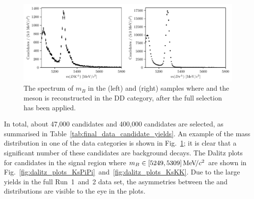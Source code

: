 

\begin{figure}[tb]
    \centering
    \includegraphics[width=\columnwidth]{figures/analysis/pretty_data_d2kspp_DD.pdf}
    \caption{The spectrum of $m_B$ in the (left) \BtoDK and (right) \BtoDpi samples where \DtoKspipi and the \KS meson is reconstructed in the DD category, after the full selection has been applied.}
    \label{fig:data_spectrum}
\end{figure}

In total, about 47,000 \BtoDK candidates and 400,000 \BtoDpi candidates are selected, as summarised in Table~\ref{tab:final_data_candidate_yields}. An example of the \B mass distribution in one of the data categories is shown in Fig.~\ref{fig:data_spectrum}; it is clear that a significant number of these candidates are background decays. The Dalitz plots for candidates in the signal region where $m_B\in[5249, 5309]\text{\,Me\kern -0.1em V\!/}c^2$ are shown in Fig.~\ref{fig:dalitz_plots_KsPiPi}~and~\ref{fig:dalitz_plots_KsKK}. Due to the large yields in the full Run~1~and~2 \lhcb data set, the asymmetries between the \Bp and \Bm distributions are visible to the eye in the \BtoDK plots.

